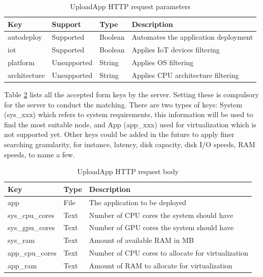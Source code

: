                 \begin{table}[H]
                    \centering
                    \caption{UploadApp HTTP request parameters}
                    \begin{tabular}{|l|l|l|l|}
                    \hline
                    \rowcolor[HTML]{C0C0C0} 
                    \textbf{Key} & \textbf{Support} & \textbf{Type} & \textbf{Description} \\ \hline
                    autodeploy & Supported & Boolean & Automates the application deployment \\ \hline
                    iot  & Supported & Boolean & Applies IoT devices filtering \\ \hline
                    platform & Unsupported & String & Applies OS filtering  \\ \hline
                    architecture & Unsupported & String & Applies CPU architecture filtering  \\ \hline
                    \end{tabular}
                    \label{tab:uploadapp_params}
                \end{table}
                
                Table \ref{tab:uploadapp_body} lists all the accepted form keys by the server. Setting these is compulsory for the server to conduct the matching. There are two types of keys: System (sys\_xxx) which refers to system requirements, this information will be used to find the most suitable node, and App (app\_xxx) used for virtualization which is not supported yet. Other keys could be added in the future to apply finer searching granularity, for instance, latency, disk capacity, disk I/O speeds, RAM speeds, to name a few.
            
                \begin{table}[H]
                    \centering
                    \caption{UploadApp HTTP request body}
                    \begin{tabular}{|l|l|l|}
                    \hline
                    \rowcolor[HTML]{C0C0C0} 
                    \textbf{Key} & \textbf{Type} & \textbf{Description} \\ \hline
                    app & File & The application to be deployed \\ \hline
                    sys\_cpu\_cores & Text & Number of CPU cores the system should have \\ \hline
                    sys\_gpu\_cores & Text & Number of GPU cores the system should have \\ \hline
                    sys\_ram & Text & Amount of available RAM in MB  \\ \hline
                    app\_cpu\_cores & Text & Number of CPU cores to allocate for virtualization \\ \hline
                    app\_ram & Text & Amount of RAM to allocate for virtualization \\ \hline
                    \end{tabular}
                    \label{tab:uploadapp_body}
                \end{table}
                
